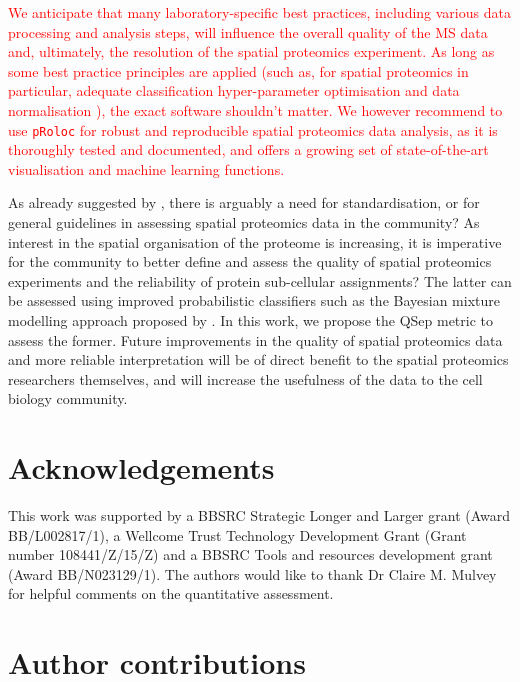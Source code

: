 \documentclass[12pt]{article}\usepackage[]{graphicx}\usepackage[]{color}
\begin{document}
\textcolor{red}{We anticipate that many laboratory-specific best
  practices, including various data processing and analysis steps,
  will influence the overall quality of the MS data and, ultimately,
  the resolution of the spatial proteomics experiment. As long as some
  best practice principles are applied (such as, for spatial
  proteomics in particular, adequate classification hyper-parameter
  optimisation and data normalisation \cite{Gatto:2014}), the exact
  software shouldn't matter. We however recommend to use
  \texttt{pRoloc} \cite{Gatto:2014a} for robust and reproducible
  spatial proteomics data analysis, as it is thoroughly tested and
  documented, and offers a growing set of state-of-the-art
  visualisation and machine learning functions.}

\bigskip


As already suggested by \citet{Lund-Johansen:2016}, there is arguably
a need for standardisation, or for general guidelines in assessing
spatial proteomics data in the community? As interest in the spatial
organisation of the proteome is increasing, it is imperative for the
community to better define and assess the quality of spatial
proteomics experiments and the reliability of protein sub-cellular
assignments? The latter can be assessed using improved probabilistic
classifiers such as the Bayesian mixture modelling approach proposed
by \citet{Crook:2018}. In this work, we propose the QSep metric to
assess the former. Future improvements in the quality of spatial
proteomics data and more reliable interpretation will be of direct
benefit to the spatial proteomics researchers themselves, and will
increase the usefulness of the data to the cell biology community.

\clearpage

\section*{Acknowledgements}

This work was supported by a BBSRC Strategic Longer and Larger grant
(Award BB/L002817/1), a Wellcome Trust Technology Development Grant
(Grant number 108441/Z/15/Z) and a BBSRC Tools and resources
development grant (Award BB/N023129/1). The authors would like to
thank Dr Claire M. Mulvey for helpful comments on the quantitative
assessment.

\section*{Author contributions}
\end{document}
